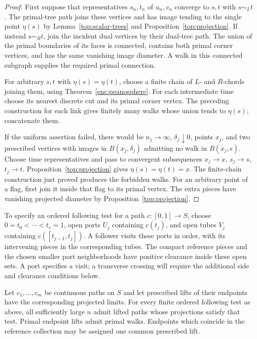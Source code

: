 \begin{proof}
First suppose that representatives $s_n,t_n$ of $u_n,v_n$ converge to
$s,t$ with $s\sim_L t$.  The primal-tree path joins these vertices and
has image tending to the single point $\eta(s)$ by
Lemma~\ref{top:scalar-trees} and Proposition~\ref{top:projection}.
If instead $s\sim_R t$, join the incident dual vertices by their
dual-tree path.  The union of the primal boundaries of its faces is
connected, contains both primal corner vertices, and has the same
vanishing image diameter.  A walk in this connected subgraph supplies
the required primal connection.

For arbitrary $s,t$ with $\eta(s)=\eta(t)$, choose a finite chain of
$L$- and $R$-chords joining them, using
Theorem~\ref{enc:peanosphere}.  For each intermediate time choose its
nearest discrete cut and its primal corner vertex.  The preceding
construction for each link gives finitely many walks whose union tends
to $\eta(s)$; concatenate them.

If the uniform assertion failed, there would be $n_j\to\infty$,
$\delta_j\downarrow0$, points $x_j$, and two prescribed vertices
with images in $B(x_j,\delta_j)$ admitting no walk in
$B(x_j,\epsilon)$.  Choose time representatives and pass to convergent
subsequences $x_j\to x$, $s_j\to s$, $t_j\to t$.
Proposition~\ref{top:projection} gives
$\eta(s)=\eta(t)=x$.  The finite-chain construction just proved
produces the forbidden walks.  For an arbitrary point of a flag, first
join it inside that flag to its primal vertex.  The extra pieces have
vanishing projected diameter by Proposition~\ref{top:projection}.
\end{proof}

To specify an ordered following test for a path $c:[0,1]\to S$,
choose $0=t_0<\cdots<t_r=1$, open ports $U_j$ containing $c(t_j)$,
and open tubes $V_j$ containing $c([t_{j-1},t_j])$.
A follower visits these ports in order, with its intervening pieces
in the corresponding tubes.  The compact reference pieces and the
chosen smaller port neighborhoods have positive clearance inside
these open sets.  A port specifies a visit; a transverse crossing
will require the additional side and clearance conditions below.

\begin{corollary}
\label{top:path-lifting}
Let $c_1,\ldots,c_m$ be continuous paths on $S$ and let prescribed
lifts of their endpoints have the corresponding projected limits.
For every finite ordered following test as above, all sufficiently
large $n$ admit lifted paths whose projections satisfy that test.
Primal endpoint lifts admit
primal walks.  Endpoints which coincide in the reference collection
may be assigned one common prescribed lift.
\end{corollary}

